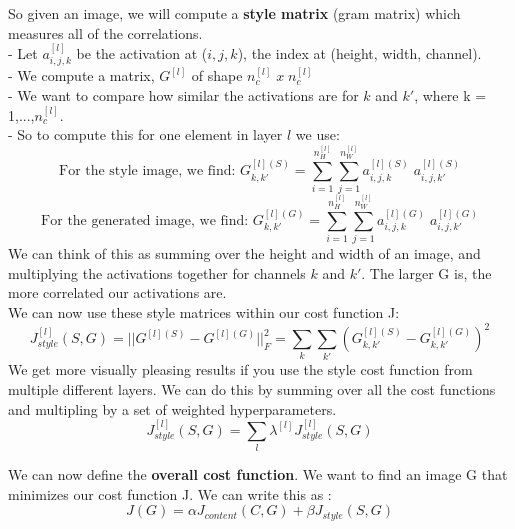 \documentclass[11pt, a4paper]{article}
\begin{document}
\begin{spacing}{1.1}
	So given an image, we will compute a \textbf{style matrix} (gram matrix) which measures all of the correlations.\\
	- Let $a^{[l]}_{i,j,k}$ be the activation at ($i,j,k$), the index at (height, width, channel). \\
	- We compute a matrix, $G^{[l]}$ of shape $n_c^{[l]}\; x\; n_c^{[l]}$ \\
	- We want to compare how similar the activations are for $k$ and $k'$, where k = 1,...,$n_c^{[l]}$.\\
	- So to compute this for one element in layer $l$ we use:
	$$\text{For the style image, we find: } G^{[l](S)}_{k,k'} = \sum_{i=1}^{n_H^{[l]}}\sum_{j=1}^{n_W^{[l]}} a^{[l](S)}_{i,j,k}\; a^{[l](S)}_{i,j,k'} $$
	$$\text{For the generated image, we find: } G^{[l](G)}_{k,k'} = \sum_{i=1}^{n_H^{[l]}}\sum_{j=1}^{n_W^{[l]}} a^{[l](G)}_{i,j,k}\; a^{[l](G)}_{i,j,k'} $$
	We can think of this as summing over the height and width of an image, and multiplying the activations together for channels $k$ and $k'$. The larger G is, the more correlated our activations are. \vspace*{1mm}\\
	We can now use these style matrices within our cost function J: 
	$$ J_{style}^{[l]}(S,G) = || G^{[l](S)} - G^{[l](G)} ||^2_F = \sum_k \sum_{k'}  (G^{[l](S)}_{k,k'} - G^{[l](G)}_{k,k'})^2 $$
	We get more visually pleasing results if you use the style cost function from multiple different layers. We can do this by summing over all the cost functions and multipling by a set of weighted hyperparameters.
	$$ J_{style}^{[l]}(S,G) = \sum_l \lambda^{[l]} J_{style}^{[l]}(S,G) $$ \newpage

	\noindent We can now define the \textbf{overall cost function}. We want to find an image G that minimizes our cost function J. We can write this as : 
	$$ J(G) = \alpha J_{content}(C,G)  + \beta J_{style}(S,G) $$
	

\end{spacing}
\end{document}
